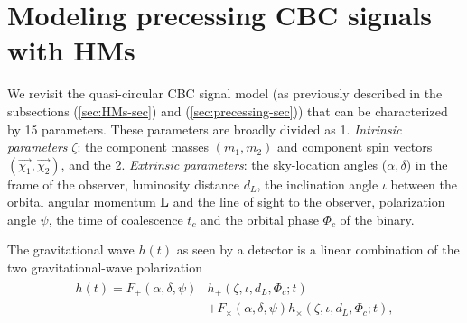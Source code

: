 \section{Modeling precessing CBC signals with HMs}\label{sec:signal_model}

We revisit the quasi-circular CBC signal model (as previously described in the subsections (\ref{sec:HMs-sec}) and (\ref{sec:precessing-sec})) that can be characterized by 15 parameters. These parameters are broadly divided as 1. \textit{Intrinsic parameters} $\zeta$: the component masses $(m_1, m_2)$ and component spin vectors $(\Vec{\chi_1}, \Vec{\chi_2})$, and the 2. \textit{Extrinsic parameters}: the sky-location angles ($\alpha, \delta$) in the frame of the observer, luminosity distance $d_L$, the inclination angle $\iota$ between the orbital angular momentum \textbf{L} and the line of sight to the observer, polarization angle $\psi$, the time of coalescence $t_c$ and the orbital phase $\Phi_c$ of the binary.

The gravitational wave $h(t)$ as seen by a detector is a linear combination of the two gravitational-wave polarization
\begin{align} 
    \begin{aligned}
    h(t) = F_{+}(\alpha, \delta, \psi) & h_{+}(\zeta, \iota, d_L, \Phi_c; t) \\ & + F_{\times}(\alpha, \delta, \psi)h_{\times}(\zeta, \iota, d_L, \Phi_c; t),
    \end{aligned}
    \label{Eq:Detector_response}
\end{align}

